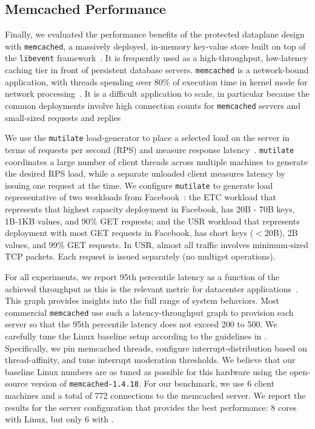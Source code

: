
\subsection{Memcached Performance}
\label{sec:eval:memcached}




Finally, we evaluated the performance benefits of the \ix protected
dataplane design with \texttt{memcached}, a massively deployed,
in-memory key-value store built on top of the \texttt{libevent}
framework~\cite{url:memcached}. It is frequently used as a
high-throughput, low-latency caching tier in front of persistent
database servers. \texttt{memcached} is a network-bound application,
with threads spending over 80\% of execution time in kernel mode for
network processing~\cite{Leverich:RHSU:2014}. It is a difficult
application to scale, in particular because the common deployments
involve high connection counts for \texttt{memcached} servers and
small-sized requests and
replies~\cite{nishtala2013scaling,Atikoglu:2012:WAL}

We use the \texttt{mutilate} load-generator to place a selected load
on the server in terms of requests per second (RPS) and measure
response latency~\cite{url:mutilate}. \texttt{mutilate} coordinates a
large number of client threads across multiple machines to generate
the desired RPS load, while a separate unloaded client measures
latency by issuing one request at the time.  We configure
\texttt{mutilate} to generate load representative of two workloads
from Facebook~\cite{Atikoglu:2012:WAL}: the ETC workload that
represents that highest capacity deployment in Facebook, has 20B - 70B
keys, 1B-1KB values, and 90\% GET requests; and the USR workload that
represents deployment with most GET requests in Facebook, has short
keys ($<$20B), 2B values, and 99\% GET requests. In USR, almost all
traffic involves minimum-sized TCP packets. Each request is issued
separately (no multiget operations).

  For all experiments, we report 95th percentile latency as
a function of the achieved throughput as this is the relevant metric
for datacenter applications~\cite{DBLP:journals/cacm/DeanB13}. This
graph provides insights into the full range of system behaviors. Most
commercial \texttt{memcached} use such a latency-throughput graph to
provision each server so that the 95th percentile latency does not
exceed 200 to 500.  We carefully tune the Linux baseline setup
according to the guidelines in
\cite{Leverich:RHSU:2014}. Specifically, we pin memcached threads,
configure interrupt-distribution based on thread-affinity, and tune
interrupt moderation thresholds. We believe that our baseline Linux
numbers are as tuned as possible for this hardware using the
open-source version of \texttt{memcached-1.4.18}. For our benchmark,
we use 6 client machines and a total of 772 connections to the
memcached server.  We report the results for the
server configuration that provides the best performance: 8 cores with
Linux, but only 6 with \ix.

